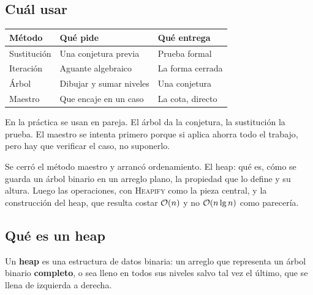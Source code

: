 \documentclass[11pt,letterpaper]{article}
\begin{document}
\subsection*{Cuál usar}

\begin{center}
\begin{tabular}{lll}
  \toprule
  \textbf{Método} & \textbf{Qué pide} & \textbf{Qué entrega} \\
  \midrule
  Sustitución & Una conjetura previa    & Prueba formal \\
  Iteración   & Aguante algebraico      & La forma cerrada \\
  Árbol       & Dibujar y sumar niveles & Una conjetura \\
  Maestro     & Que encaje en un caso   & La cota, directo \\
  \bottomrule
\end{tabular}
\end{center}

\begin{idea}
  En la práctica se usan en pareja. El árbol da la conjetura, la
  sustitución la prueba. El maestro se intenta primero porque si
  aplica ahorra todo el trabajo, pero hay que verificar el caso, no
  suponerlo.
\end{idea}

\newpage



\begin{quick_sum}
  Se cerró el método maestro y arrancó ordenamiento. El heap: qué es,
  cómo se guarda un árbol binario en un arreglo plano, la propiedad
  que lo define y su altura. Luego las operaciones, con
  \textsc{Heapify} como la pieza central, y la construcción del heap,
  que resulta costar $\mathcal{O}\!\left(n\right)$ y no $\mathcal{O}\!\left(n \lg n\right)$ como parecería.
\end{quick_sum}

\subsection*{Qué es un heap}

\begin{definicion}
  Un \textbf{heap} es una estructura de datos binaria: un arreglo que
  representa un árbol binario \textbf{completo}, o sea lleno en todos
  sus niveles salvo tal vez el último, que se llena de izquierda a
  derecha.
\end{definicion}
\end{document}

